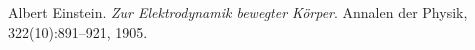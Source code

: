 \begin{thebibliography}{9}
	Albert Einstein.
	\textit{Zur Elektrodynamik bewegter Körper}.
	Annalen der Physik, 322(10):891–921, 1905.
\end{thebibliography}